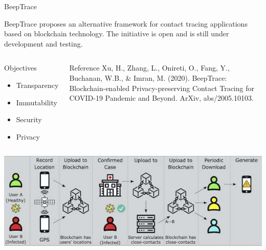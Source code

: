 \begin{frame}{BeepTrace}

    \centering
    BeepTrace proposes an alternative framework for contact tracing applications based on blockchain technology. The initiative is open and is still under development and testing.
    
    \begin{columns}[T]
        \begin{block}{Objectives}
            \begin{itemize}
                \item Transparency
                \item Immutability
                \item Security
                \item Privacy
            \end{itemize}
        \end{block}
        
        \begin{block}{Reference}
            \small{Xu, H., Zhang, L., Onireti, O., Fang, Y., Buchanan, W.B., \& Imran, M. (2020). BeepTrace: Blockchain-enabled Privacy-preserving Contact Tracing for COVID-19 Pandemic and Beyond. ArXiv, abs/2005.10103.}
        \end{block}
    \end{columns}
    
    \vspace{10pt}
    
    \centering
    \includegraphics[width=0.8\linewidth]{images/beeptrace.jpg}
\end{frame}

